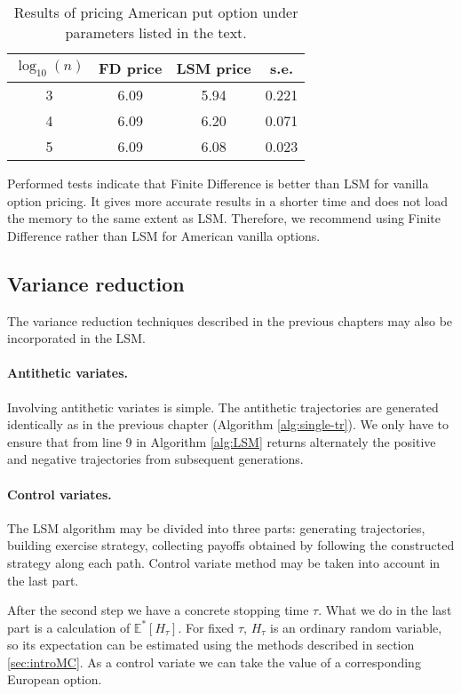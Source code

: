 \documentclass[a4paper,11pt, twoside]{book}
\theoremstyle{definition}
\theoremstyle{remark}
\def\Em{{\mathbb{E}^*}}
\begin{document}
\begin{table}[!ht]
\centering
 \caption{Results of pricing American put option under parameters listed in the text.}
 \label{tab:LSM_res}
\begin{tabular} {||c | c | c | c ||}  
 \hline 
  $\log_{10}(n)$ & FD price & LSM price & s.e. \\ \hline
  3 & 6.09 & 5.94 & 0.221 \\ \hline 
  4 & 6.09 & 6.20 & 0.071 \\ \hline 
  5 & 6.09 & 6.08 & 0.023 \\ \hline 
\end{tabular}  
\end{table}

Performed tests indicate that Finite Difference is better than LSM for vanilla option pricing. It gives more accurate results in a shorter time and does not load the memory to the same extent as LSM. Therefore, we recommend using Finite Difference rather than LSM for American vanilla options.

\subsection{Variance reduction}
The variance reduction techniques described in the previous chapters may also be incorporated in the LSM.
\paragraph{Antithetic variates.} Involving antithetic variates is simple. The antithetic trajectories are generated identically as in the previous chapter (Algorithm \ref{alg:single-tr}). We only have to ensure that  from line 9 in Algorithm \ref{alg:LSM} returns alternately the positive and negative trajectories from subsequent generations. 

\paragraph{Control variates.} The LSM algorithm may be divided into three parts: generating trajectories, building exercise strategy, collecting payoffs obtained by following the constructed strategy along each path. Control variate method may be taken into account in the last part. 

After the second step we have a concrete stopping time $\tau$. What we do in the last part is a calculation of $\Em[H_\tau]$. For fixed $\tau$, $H_\tau$ is an ordinary random variable, so its expectation can be estimated using the methods described in section \ref{sec:introMC}. As a control variate we can take the value of a corresponding European option.
\end{document}

